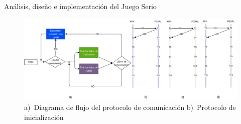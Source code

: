 \begin{thesischapter}{2} {Análisis, diseño e implementación del Juego Serio}


    




    \begin{figure}[ht]
        \centering
        \includegraphics[scale=0.32]{images/diagram-protocol.png}
        \caption{a)~Diagrama de flujo del protocolo de comunicación b)~Protocolo de inicialización}
        \label{fig: diagram-protocol}
    \end{figure}


\end{thesischapter}

